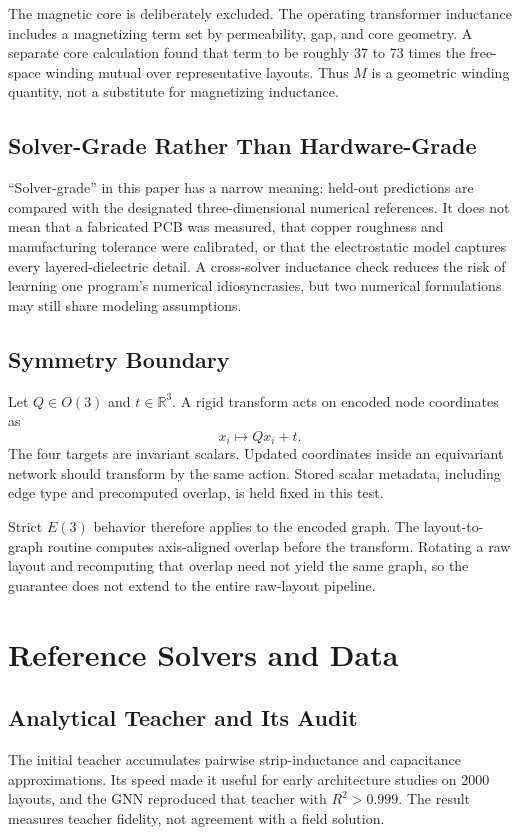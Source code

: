 \documentclass[letterpaper,twocolumn,9pt]{extarticle}
\newcommand{\Mut}{M}
\begin{document}
The magnetic core is deliberately excluded. The operating transformer inductance includes a magnetizing term set by permeability, gap, and core geometry. A separate core calculation found that term to be roughly 37 to 73 times the free-space winding mutual over representative layouts. Thus $\Mut$ is a geometric winding quantity, not a substitute for magnetizing inductance.

\subsection{Solver-Grade Rather Than Hardware-Grade}
``Solver-grade'' in this paper has a narrow meaning: held-out predictions are compared with the designated three-dimensional numerical references. It does not mean that a fabricated PCB was measured, that copper roughness and manufacturing tolerance were calibrated, or that the electrostatic model captures every layered-dielectric detail. A cross-solver inductance check reduces the risk of learning one program's numerical idiosyncrasies, but two numerical formulations may still share modeling assumptions.

\subsection{Symmetry Boundary}
Let $Q\in O(3)$ and $t\in\mathbb{R}^3$. A rigid transform acts on encoded node coordinates as
\begin{equation}
x_i\mapsto Qx_i+t.
\end{equation}
The four targets are invariant scalars. Updated coordinates inside an equivariant network should transform by the same action. Stored scalar metadata, including edge type and precomputed overlap, is held fixed in this test.

Strict $E(3)$ behavior therefore applies to the encoded graph. The layout-to-graph routine computes axis-aligned overlap before the transform. Rotating a raw layout and recomputing that overlap need not yield the same graph, so the guarantee does not extend to the entire raw-layout pipeline.

\section{Reference Solvers and Data}
\subsection{Analytical Teacher and Its Audit}
The initial teacher accumulates pairwise strip-inductance and capacitance approximations. Its speed made it useful for early architecture studies on 2000 layouts, and the GNN reproduced that teacher with $R^2>0.999$. The result measures teacher fidelity, not agreement with a field solution.
\end{document}
